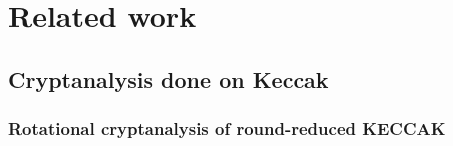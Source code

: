 \chapter{Related work}



\section{Cryptanalysis done on Keccak}

\subsection{Rotational cryptanalysis of round-reduced KECCAK}

